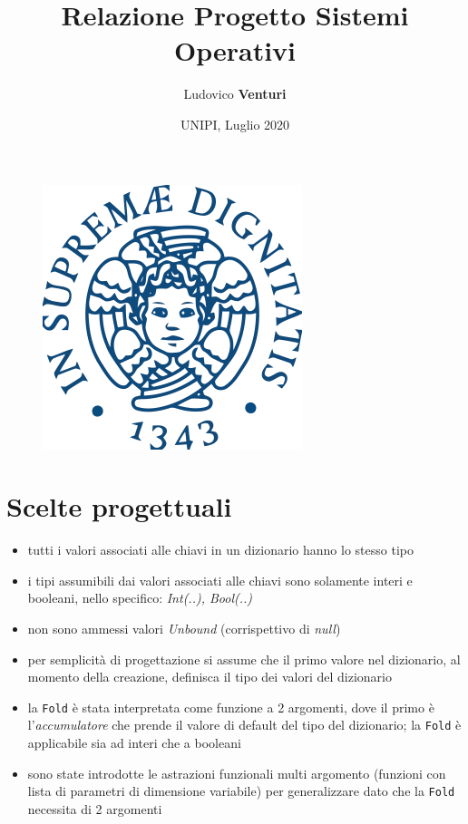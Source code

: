 \documentclass[11pt, a4paper]{article}
\title{\textbf{Relazione Progetto Sistemi Operativi}}
\author{Ludovico \textbf{Venturi}}
\date{UNIPI, Luglio 2020}
\begin{document}
\maketitle
\tableofcontents
\vfill
\begin{figure}[h]
	\centering
	\includegraphics[scale=0.3]{unipi}
	\label{fig:0}
\end{figure}

\clearpage

\section{Scelte progettuali}
\begin{itemize}
\item tutti i valori associati alle chiavi in un dizionario hanno lo stesso tipo
\item i tipi assumibili dai valori associati alle chiavi sono solamente interi e booleani, nello specifico: \textit{Int(..), Bool(..)}
\item non sono ammessi valori \textit{Unbound} (corrispettivo di \textit{null})
\item per semplicità di progettazione si assume che il primo valore nel dizionario, al momento della creazione, definisca il tipo dei valori del dizionario
\item la \texttt{Fold} è stata interpretata come funzione a 2 argomenti, dove il primo è l'\textit{accumulatore} che prende il valore di default del tipo del dizionario; la \texttt{Fold} è applicabile sia ad interi che a booleani
\item sono state introdotte le astrazioni funzionali multi argomento (funzioni con lista di parametri di dimensione variabile) per generalizzare dato che la \texttt{Fold} necessita di 2 argomenti
\end{itemize}
\end{document}
